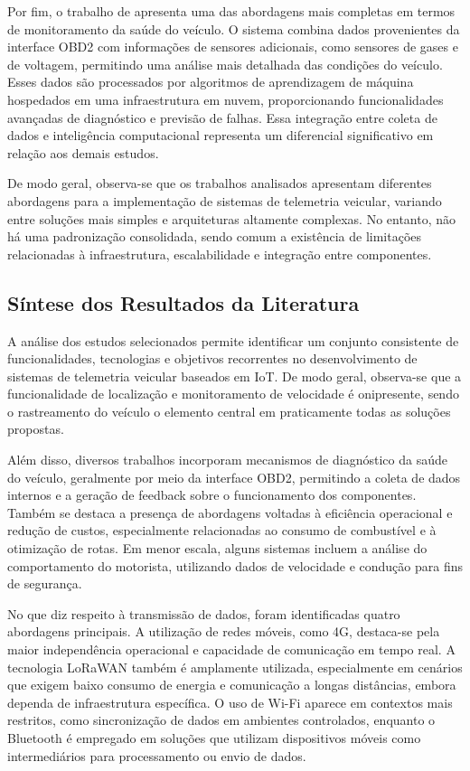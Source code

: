 \documentclass[
	article,			%
	11pt,				%
	oneside,			%
	a4paper,			%
	english,			%
	brazil,				%
	sumario=tradicional
	]{abntex2}
\begin{document}
Por fim, o trabalho de \cite{hussain2021caretalk} apresenta uma das abordagens mais completas em termos de monitoramento da saúde do veículo. O sistema combina dados provenientes da interface OBD2 com informações de sensores adicionais, como sensores de gases e de voltagem, permitindo uma análise mais detalhada das condições do veículo. Esses dados são processados por algoritmos de aprendizagem de máquina hospedados em uma infraestrutura em nuvem, proporcionando funcionalidades avançadas de diagnóstico e previsão de falhas. Essa integração entre coleta de dados e inteligência computacional representa um diferencial significativo em relação aos demais estudos.

De modo geral, observa-se que os trabalhos analisados apresentam diferentes abordagens para a implementação de sistemas de telemetria veicular, variando entre soluções mais simples e arquiteturas altamente complexas. No entanto, não há uma padronização consolidada, sendo comum a existência de limitações relacionadas à infraestrutura, escalabilidade e integração entre componentes.

\subsection{Síntese dos Resultados da Literatura}

A análise dos estudos selecionados permite identificar um conjunto consistente de funcionalidades, tecnologias e objetivos recorrentes no desenvolvimento de sistemas de telemetria veicular baseados em IoT. De modo geral, observa-se que a funcionalidade de localização e monitoramento de velocidade é onipresente, sendo o rastreamento do veículo o elemento central em praticamente todas as soluções propostas.

Além disso, diversos trabalhos incorporam mecanismos de diagnóstico da saúde do veículo, geralmente por meio da interface OBD2, permitindo a coleta de dados internos e a geração de feedback sobre o funcionamento dos componentes. Também se destaca a presença de abordagens voltadas à eficiência operacional e redução de custos, especialmente relacionadas ao consumo de combustível e à otimização de rotas. Em menor escala, alguns sistemas incluem a análise do comportamento do motorista, utilizando dados de velocidade e condução para fins de segurança.

No que diz respeito à transmissão de dados, foram identificadas quatro abordagens principais. A utilização de redes móveis, como 4G, destaca-se pela maior independência operacional e capacidade de comunicação em tempo real. A tecnologia LoRaWAN também é amplamente utilizada, especialmente em cenários que exigem baixo consumo de energia e comunicação a longas distâncias, embora dependa de infraestrutura específica. O uso de Wi-Fi aparece em contextos mais restritos, como sincronização de dados em ambientes controlados, enquanto o Bluetooth é empregado em soluções que utilizam dispositivos móveis como intermediários para processamento ou envio de dados.
\end{document}
